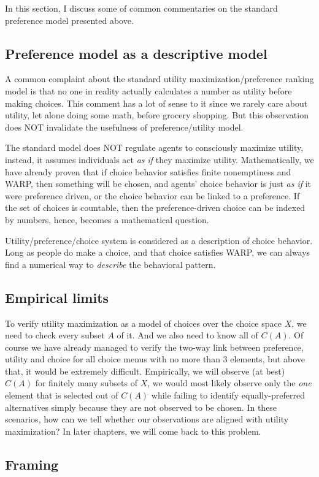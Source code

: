 In this section, I discuss some of common commentaries on the standard preference model presented above.

\subsection{Preference model as a descriptive model}
A common complaint about the standard utility maximization/preference ranking model is that no one in reality actually calculates a number as utility before making choices.
This comment has a lot of sense to it since we rarely care about utility, let alone doing some math, before grocery shopping. But this observation does NOT invalidate the 
usefulness of preference/utility model.

The standard model does NOT regulate agents to consciously maximize utility, instead, it assumes individuals act \textit{as if} they maximize utility. Mathematically, we have already
proven that if choice behavior satisfies finite nonemptiness and WARP, then something will be chosen, and agents' choice behavior is just \textit{as if} it were preference driven, or the choice
behavior can be linked to a preference. If the set of choices is countable, then the preference-driven choice can be indexed by numbers, hence, becomes a mathematical question.

Utility/preference/choice system is considered as a description of choice behavior. Long as people do make a choice, and that choice satisfies WARP, we can always find a numerical way to 
\textit{describe} the behavioral pattern.

\subsection{Empirical limits}
To verify utility maximization as a model of choices over the choice space $X$, we need to check every subset $A$ of it. And we also need to know all of $C(A)$. Of course we have already managed to verify the two-way link between
preference, utility and choice for all choice menus with no more than 3 elements, but above that, it would be extremely difficult. Empirically, we will observe (at best) $C(A)$ for finitely many subsets of $X$, we would most likely
observe only the \textit{one} element that is selected out of $C(A)$ while failing to identify equally-preferred alternatives simply because they are not observed to be chosen. In these scenarios, how can we tell whether our observations
are aligned with utility maximization? In later chapters, we will come back to this problem.

\subsection{Framing}
